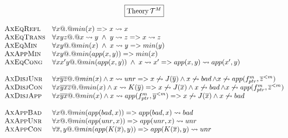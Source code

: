 \documentclass[preprint]{sigplanconf}
\begin{document}
\begin{figure*}
\setlength{\arraycolsep}{3pt}
\[\begin{array}{c}
\fbox{$\mbox{Theory}\,{\cal T}^M$} \\ \\ 
\begin{array}{ll}
 \textsc{AxEqRefl}  & \forall x @.@ min(x) => x \rightsquigarrow x \\
 \textsc{AxEqTrans} & \forall xyz @.@ x \rightsquigarrow y \;\land\; y \rightsquigarrow z => x \rightsquigarrow z \\
 \textsc{AxEqMin}   & \forall xy @.@ min(x) \;\land\; x \rightsquigarrow y => min(y) \\
 \textsc{AxAppMin}  & {\forall x y @.@ min(app(x,y)) => min(x) } \\
 \textsc{AxEqCong}  & \forall x x' y @.@ min(app(x,y))\;\land\;x \rightsquigarrow x' => app(x,y) \rightsquigarrow app(x',y) \\ \\ 


 \textsc{AxDisjUnr}  & \forall x\overline{y}\overline{z} @.@ min(x) \land x \rightsquigarrow \mathop{unr} => 
                         x \not\rightsquigarrow J(\overline{y}) \land x \not\rightsquigarrow \mathop{bad} \land x \not\rightsquigarrow app(f_{ptr}^m,\overline{z}^{< m}) \\
 \textsc{AxDisjCon}  & \forall x\overline{y}\overline{x}\overline{z} @.@ min(x) \land x \rightsquigarrow K(\overline{y}) => 
                         x \not\rightsquigarrow J(\overline{x}) \land x \not\rightsquigarrow \mathop{bad} \land x \not\rightsquigarrow app(f_{ptr}^m,\overline{z}^{< m}) \\
 \textsc{AxDisjApp}  & \forall x\overline{y}\overline{x} @.@ min(x) \land x \rightsquigarrow app(f_{ptr}^m,\overline{y}^{< m}) => x \not\rightsquigarrow J(\overline{x}) \land x \not\rightsquigarrow \mathop{bad} \\ \\ 

 \textsc{AxAppBad}   & \forall x @.@ min(app(\mathop{bad},x)) => app(\mathop{bad},x) \rightsquigarrow \mathop{bad} \\
 \textsc{AxAppUnr}   & \forall x @.@ min(app(\mathop{unr},x)) => app(\mathop{unr},x) \rightsquigarrow \mathop{unr} \\
 \textsc{AxAppCon}   & \forall \overline{x},y @.@ min(app(K(\overline{x}),y)) => app(K(\overline{x}),y) \rightsquigarrow \mathop{unr} 


\end{array}
\end{array}\]
\end{figure*}
\end{document}
